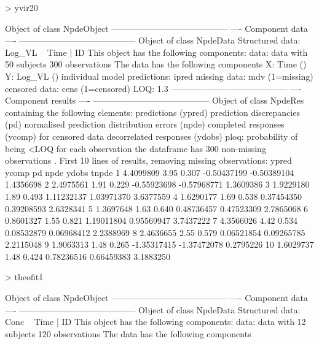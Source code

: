 \documentclass{report}
\begin{document}
\begin{mdframed}[backgroundcolor=green!13]
\begin{Schunk}
\begin{Sinput}
> yvir20
\end{Sinput}
\begin{Soutput}
Object of class NpdeObject
-----------------------------------------
----        Component data           ----
-----------------------------------------
Object of class NpdeData
    Structured data: Log_VL ~ Time | ID 
This object has the following components:
     data: data
     with 50 subjects
      300 observations
The data has the following components
     X: Time () 
     Y: Log_VL () 
     individual model predictions: ipred 
     missing data: mdv  (1=missing)
     censored data: cens  (1=censored)
      LOQ:     1.3 
-----------------------------------------
----        Component results        ----
-----------------------------------------
Object of class NpdeRes
  containing the following elements:
    predictions (ypred)
    prediction discrepancies (pd)
    normalised prediction distribution errors (npde)
    completed responses (ycomp) for censored data
    decorrelated responses (ydobs)
    ploq: probability of being <LOQ for each observation
  the dataframe has  300 non-missing observations .
First 10 lines of results, removing missing observations:
       ypred ycomp    pd        npde       ydobs     tnpde
1  4.4099809  3.95 0.307 -0.50437199 -0.50389104 1.4356698
2  2.4975561  1.91 0.229 -0.55923698 -0.57968771 1.3609386
3  1.9229180  1.89 0.493  1.11232137  1.03971370 3.6377559
4  1.6290177  1.69 0.538  0.37454350  0.39208593 2.6328341
5  1.3697648  1.63 0.640  0.48736457  0.47523309 2.7865068
6  0.8601327  1.55 0.821  1.19011804  0.95569947 3.7437222
7  4.3566026  4.42 0.534  0.08532879  0.06968412 2.2388969
8  2.4636655  2.55 0.579  0.06521854  0.09265785 2.2115048
9  1.9063313  1.48 0.265 -1.35317415 -1.37472078 0.2795226
10 1.6029737  1.48 0.424  0.78236516  0.66459383 3.1883250
\end{Soutput}
\begin{Sinput}
> theofit1
\end{Sinput}
\begin{Soutput}
Object of class NpdeObject
-----------------------------------------
----        Component data           ----
-----------------------------------------
Object of class NpdeData
    Structured data: Conc ~ Time | ID 
This object has the following components:
     data: data
     with 12 subjects
      120 observations
The data has the following components

\end{Soutput}
\end{Schunk}
\end{mdframed}
\end{document}
